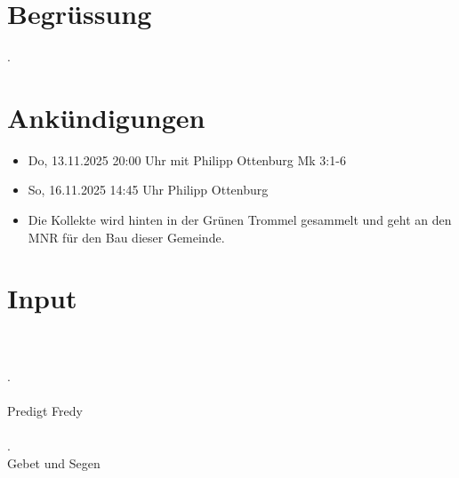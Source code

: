 \documentclass{../../inc/mybib}
\begin{document}
\section{Begrüssung}

\beten{}

.

\section{Ankündigungen}
\begin{itemize}
    \item {} Do, 13.11.2025 20:00 Uhr mit Philipp Ottenburg Mk 3:1-6
    \item {} So, 16.11.2025 14:45 Uhr Philipp Ottenburg
    \item Die Kollekte wird hinten in der Grünen Trommel gesammelt und geht an den MNR für den Bau dieser Gemeinde.
\end{itemize}

\section{ Input }

    \\    
    \\    
    .\\
    \\
    Predigt Fredy\\
    \\
    .
    \\
    Gebet und Segen\\
\end{document}
